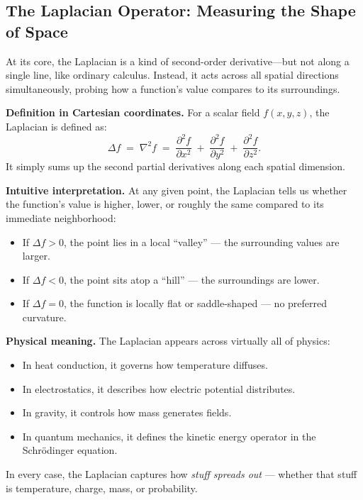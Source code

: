 \subsection{The Laplacian Operator: Measuring the Shape of Space}

At its core, the Laplacian is a kind of second-order derivative—but not along a single line, like ordinary calculus. Instead, it acts across all spatial directions simultaneously, probing how a function’s value compares to its surroundings.

\medskip

\noindent\textbf{Definition in Cartesian coordinates.}  
For a scalar field \( f(x,y,z) \), the Laplacian is defined as:
\[
\Delta f \;=\; \nabla^2 f \;=\;
\frac{\partial^2 f}{\partial x^2}
\;+\;
\frac{\partial^2 f}{\partial y^2}
\;+\;
\frac{\partial^2 f}{\partial z^2}.
\]
It simply sums up the second partial derivatives along each spatial dimension.

\medskip

\noindent\textbf{Intuitive interpretation.}  
At any given point, the Laplacian tells us whether the function’s value is higher, lower, or roughly the same compared to its immediate neighborhood:
\begin{itemize}
    \item If \( \Delta f > 0 \), the point lies in a local “valley” — the surrounding values are larger.
    \item If \( \Delta f < 0 \), the point sits atop a “hill” — the surroundings are lower.
    \item If \( \Delta f = 0 \), the function is locally flat or saddle-shaped — no preferred curvature.
\end{itemize}

\medskip

\noindent\textbf{Physical meaning.}  
The Laplacian appears across virtually all of physics:
\begin{itemize}
    \item In heat conduction, it governs how temperature diffuses.
    \item In electrostatics, it describes how electric potential distributes.
    \item In gravity, it controls how mass generates fields.
    \item In quantum mechanics, it defines the kinetic energy operator in the Schrödinger equation.
\end{itemize}

In every case, the Laplacian captures how \emph{stuff spreads out} — whether that stuff is temperature, charge, mass, or probability.

